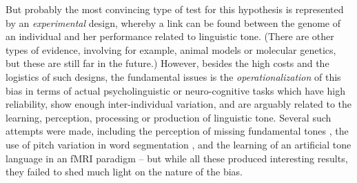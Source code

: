 \documentclass[twoside,twocolumn]{article}
\begin{document}
But probably the most convincing type of test for this hypothesis is represented by an \emph{experimental} design, whereby a link can be found between the genome of an individual and her performance related to linguistic tone.
(There are other types of evidence, involving for example, animal models or molecular genetics, but these are still far in the future.)
However, besides the high costs and the logistics of such designs, the fundamental issues is the \emph{operationalization} of this bias in terms of actual psycholinguistic or neuro-cognitive tasks which have high reliability, show enough inter-individual variation, and are arguably related to the learning, perception, processing or production of linguistic tone.
Several such attempts were made, including the perception of missing fundamental tones \citep{ladd_missingfund_2013}, the use of pitch variation in word segmentation \citep{caldwellharris_factors_2015}, and the learning of an artificial tone language in an fMRI paradigm \citep{asaridou_repetition_2016} -- but while all these produced interesting results, they failed to shed much light on the nature of the bias.
\end{document}
